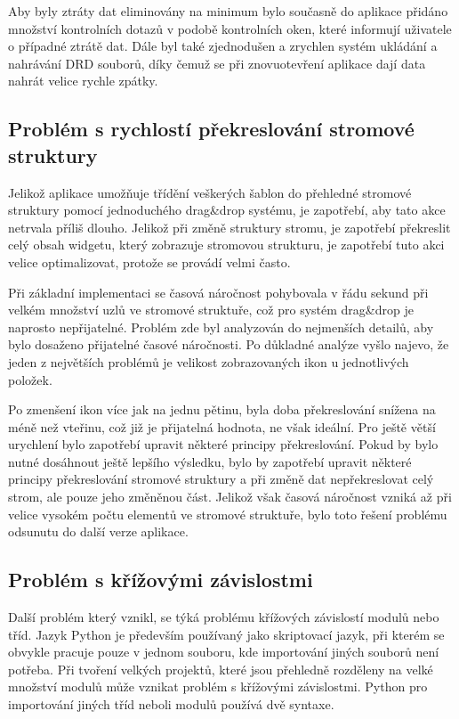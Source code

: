 \documentclass[thesis=B,czech]{resources/FITthesis}[2012/06/26]
\begin{document}
Aby byly ztráty dat eliminovány na minimum bylo současně do aplikace přidáno množství kontrolních dotazů v podobě kontrolních oken, které informují uživatele o případné ztrátě dat. Dále byl také zjednodušen a zrychlen systém ukládání a nahrávání DRD souborů, díky čemuž se při znovuotevření aplikace dají data nahrát velice rychle zpátky. 

	\subsection{Problém s rychlostí překreslování stromové struktury}
Jelikož aplikace umožňuje třídění veškerých šablon do přehledné stromové struktury pomocí jednoduchého drag\&drop systému, je zapotřebí, aby tato akce netrvala příliš dlouho. Jelikož při změně struktury stromu, je zapotřebí překreslit celý obsah widgetu, který zobrazuje stromovou strukturu, je zapotřebí tuto akci velice optimalizovat, protože se provádí velmi často. \par

Při základní implementaci se časová náročnost pohybovala v řádu sekund při velkém množství uzlů ve stromové struktuře, což pro systém drag\&drop je naprosto nepřijatelné. Problém zde byl analyzován do nejmenších detailů, aby bylo dosaženo přijatelné časové náročnosti. Po důkladné analýze vyšlo najevo, že jeden z největších problémů je velikost zobrazovaných ikon u jednotlivých položek. \par

Po zmenšení ikon více jak na jednu pětinu, byla doba překreslování snížena na méně než vteřinu, což již je přijatelná hodnota, ne však ideální. Pro ještě větší urychlení bylo zapotřebí upravit některé principy překreslování. Pokud by bylo nutné dosáhnout ještě lepšího výsledku, bylo by zapotřebí upravit některé principy překreslování stromové struktury a při změně dat nepřekreslovat celý strom, ale pouze jeho změněnou část. Jelikož však časová náročnost vzniká až při velice vysokém počtu elementů ve stromové struktuře, bylo toto řešení problému odsunutu do další verze aplikace. 

	\subsection{Problém s křížovými závislostmi}
Další problém který vznikl, se týká problému křížových závislostí modulů nebo tříd. Jazyk Python je především používaný jako skriptovací jazyk, při kterém se obvykle pracuje pouze v jednom souboru, kde importování jiných souborů není potřeba. Při tvoření velkých projektů, které jsou přehledně rozděleny na velké množství modulů může vznikat problém s křížovými závislostmi. Python pro importování jiných tříd neboli modulů používá dvě syntaxe.
\end{document}
